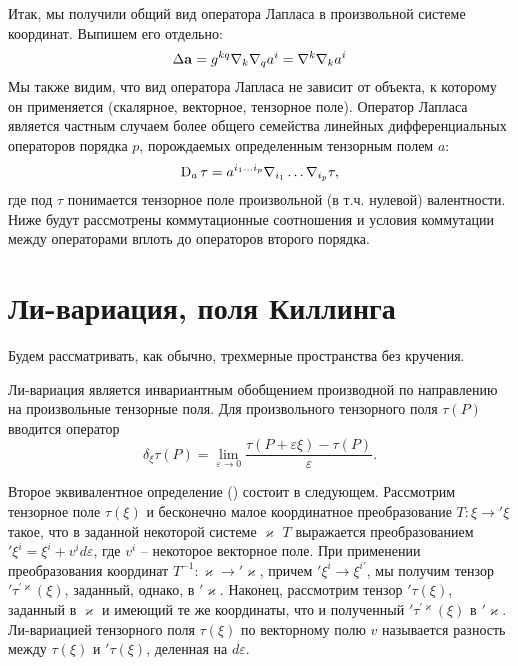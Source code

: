 \documentclass[12pt,a4paper]{article}
\begin{document}
        Итак, мы получили общий вид оператора Лапласа в произвольной системе координат. Выпишем его отдельно:
        \begin{equation}
            \Delta{\mathbf{a}} = g^{kq} \nabla_k \nabla_{q} a^i
                          = \nabla^k \nabla_k a^i
        \end{equation}
        Мы также видим, что вид оператора Лапласа не зависит от объекта, к которому он применяется (скалярное, векторное, тензорное поле). Оператор Лапласа является частным случаем более общего семейства линейных дифференциальных операторов порядка $p$, порождаемых определенным тензорным полем $a$:
        \begin{equation}
            \operatorname{D}_a\tau = a^{i_1 \dots i_p} \nabla_{i_1} \dots \nabla_{i_p} \tau ,
        \end{equation}
        где под $\tau$ понимается тензорное поле произвольной (в т.ч. нулевой) валентности. Ниже будут рассмотрены коммутационные соотношения и условия коммутации между операторами вплоть до операторов второго порядка.


    \section{Ли-вариация, поля Киллинга}

        Будем рассматривать, как обычно, трехмерные пространства без кручения.

        Ли-вариация является инвариантным обобщением производной по направлению на произвольные тензорные поля. Для произвольного тензорного поля $\tau(P)$ вводится оператор
        \begin{equation}
            \delta_\xi \tau(P) = \lim\limits_{\varepsilon \to 0} \frac{
                \tau(P + \varepsilon \xi) - \tau(P)
            }{\varepsilon}.
        \end{equation}

        Второе эквивалентное определение (\cite{lie_derivative_theory}) состоит в следующем. Рассмотрим тензорное поле $\tau(\xi)$ и бесконечно малое координатное преобразование $T: \xi \rightarrow {'\xi}$ такое, что в заданной некоторой системе $\varkappa$ $T$ выражается преобразованием $'\xi^i = \xi^i + v^i d\varepsilon$, где $v^i$ -- некоторое векторное поле. При применении преобразования координат $T^{-1}: \varkappa \rightarrow {'\varkappa}$, причем $'\xi^i \rightarrow \xi^{i'}$, мы получим тензор $'\tau^{'\varkappa}(\xi)$, заданный, однако, в $'\varkappa$. Наконец, рассмотрим тензор $'\tau(\xi)$, заданный в $\varkappa$ и имеющий те же координаты, что и полученный $'\tau^{'\varkappa}(\xi)$ в $'\varkappa$. Ли-вариацией тензорного поля $\tau(\xi)$ по векторному полю $v$ называется разность между $\tau(\xi)$ и $'\tau(\xi)$, деленная на $d\varepsilon$.
\end{document}
